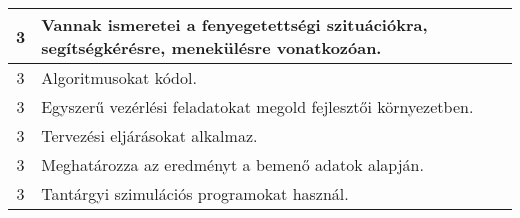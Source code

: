 \begin{longtable}{c | p{12cm} }
                                          3 &  Vannak ismeretei a fenyegetettségi szituációkra, segítségkérésre, menekülésre vonatkozóan. \\ \hline
                                          3 &  Algoritmusokat kódol. \\ \hline
                                          3 &  Egyszerű vezérlési feladatokat megold fejlesztői környezetben. \\ \hline
                                          3 &  Tervezési eljárásokat alkalmaz. \\ \hline
                                          3 &  Meghatározza az eredményt a bemenő adatok alapján. \\ \hline
                                          3 &  Tantárgyi szimulációs programokat használ. \\ \hline
                                      

\end{longtable}
